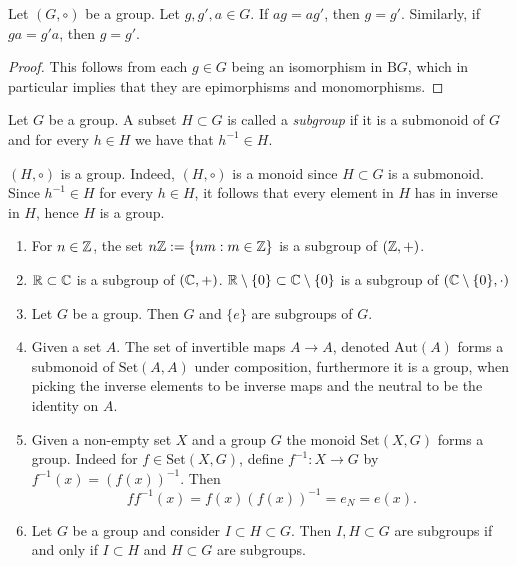 \begin{lemma}\label{LeftAndRightMultiplicationIsInjective}
    Let $(G,\circ)$ be a group. Let $g,g',a\in G$. If $ag = ag'$, then $g=g'$. Similarly, if $ga=g'a$, then $g=g'$.
\end{lemma}
\begin{proof}
    This follows from each $g\in G$ being an isomorphism in $\mathrm{B}G$, which in particular implies that they are epimorphisms and monomorphisms. 
\end{proof}
\begin{definition}
    Let $G$ be a group. A subset $H\subset G$ is called a \textit{subgroup} if it is a submonoid of $G$ and for every $h \in H$ we have that $h^{-1} \in H$.
\end{definition}
\begin{remark}\label{ASubgroupIsAGroup}
    $(H,\circ)$ is a group. Indeed, $(H,\circ)$ is a monoid since $H\subset G$ is a submonoid. Since $h^{-1}\in H$ for every $h\in H$, it follows that every element in $H$ has in inverse in $H$, hence $H$ is a group.
\end{remark}
\begin{example}
    \begin{enumerate}
        \item For $n\in \mathbb{Z}$, the set $n\mathbb{Z} := \{nm : m\in \mathbb{Z}\}$ is a subgroup of $(\mathbb{Z},+)$.
        \item $\mathbb{R}\subset \mathbb{C}$ is a subgroup of $(\mathbb{C},+)$. $\mathbb{R}\setminus \{0\} \subset \mathbb{C}\setminus \{0\}$ is a subgroup of $(\mathbb{C}\setminus \{0\},\cdot)$
        \item Let $G$ be a group. Then $G$ and $\{e\}$ are subgroups of $G$.
        \item Given a set $A$. The set of invertible maps $A\rightarrow A$, denoted $\mathrm{Aut}(A)$ forms a submonoid of $\mathrm{Set}(A,A)$ under composition, furthermore it is a group, when picking the inverse elements to be inverse maps and the neutral to be the identity on $A$. 
        \item Given a non-empty set $X$ and a group $G$ the monoid $\mathrm{Set}(X,G)$ forms a group. Indeed for $f\in \mathrm{Set}(X,G)$, define $f^{-1}:X\rightarrow G$ by $f^{-1}(x) = \left(f(x)\right)^{-1}$. Then 
        $$ff^{-1}(x) = f(x)\left(f(x)\right)^{-1}= e_N = e(x).$$
        \item Let $G$ be a group and consider $I\subset H \subset G$. Then $I,H\subset G $ are subgroups if and only if $I\subset H$ and $H\subset G$ are subgroups.
    \end{enumerate}
\end{example}
